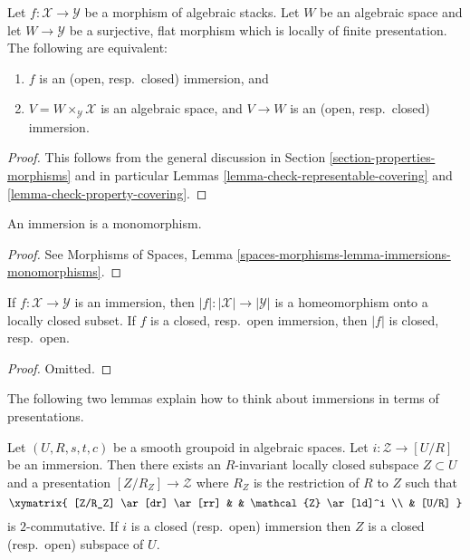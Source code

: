 \begin{lemma}
\label{lemma-check-immersion-covering}
Let $f : \mathcal{X} \to \mathcal{Y}$ be a morphism of algebraic stacks.
Let $W$ be an algebraic space and let $W \to \mathcal{Y}$ be a surjective,
flat morphism which is locally of finite presentation. The following
are equivalent:
\begin{enumerate}
\item $f$ is an (open, resp.\ closed) immersion, and
\item $V = W \times_\mathcal{Y} \mathcal{X}$ is an algebraic space, and
$V \to W$ is an (open, resp.\ closed) immersion.
\end{enumerate}
\end{lemma}

\begin{proof}
This follows from the general discussion in
Section \ref{section-properties-morphisms}
and in particular
Lemmas \ref{lemma-check-representable-covering} and
\ref{lemma-check-property-covering}.
\end{proof}

\begin{lemma}
\label{lemma-immersion-monomorphism}
An immersion is a monomorphism.
\end{lemma}

\begin{proof}
See
Morphisms of Spaces,
Lemma \ref{spaces-morphisms-lemma-immersions-monomorphisms}.
\end{proof}

\begin{lemma}
\label{lemma-subspace-induced-topology}
If $f : \mathcal{X} \to \mathcal{Y}$ is an immersion, then
$|f| : |\mathcal{X}| \to |\mathcal{Y}|$ is a homeomorphism
onto a locally closed subset. If $f$ is a closed, resp.\ open
immersion, then $|f|$ is closed, resp.\ open.
\end{lemma}

\begin{proof}
Omitted.
\end{proof}

\noindent
The following two lemmas explain how to think about
immersions in terms of presentations.

\begin{lemma}
\label{lemma-immersion-into-presentation}
Let $(U, R, s, t, c)$ be a smooth groupoid in algebraic spaces.
Let $i : \mathcal{Z} \to [U/R]$ be an immersion.
Then there exists an $R$-invariant locally closed subspace
$Z \subset U$ and a presentation $[Z/R_Z] \to \mathcal{Z}$
where $R_Z$ is the restriction of $R$ to $Z$ such that
$$
\xymatrix{
[Z/R_Z] \ar[dr] \ar[rr] & & \mathcal{Z} \ar[ld]^i \\
& [U/R]
}
$$
is $2$-commutative. If $i$ is a closed (resp.\ open) immersion
then $Z$ is a closed (resp.\ open) subspace of $U$.
\end{lemma}

